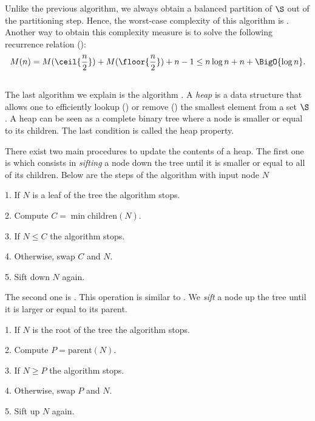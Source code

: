 Unlike the previous algorithm, we always obtain a balanced partition of
\(\S\) out of the partitioning step. Hence, the worst-case complexity of this
algorithm is . Another way to obtain this complexity measure
is to solve the following recurrence relation (\citet*{OEIS:A001855}):
\begin{displaymath}
M(n) = M(\ceil{\frac{n}{2}}) + M(\floor{\frac{n}{2}}) + n - 1 \le n \log n +
n + \BigO{\log n}.
\end{displaymath}

\subsection{\heapsort}
The last algorithm we explain is the \heapsort algorithm
\cite{williams:1964}. A \emph{heap} is a data structure that allows one to
efficiently lookup () or remove () the smallest element
from a set \(\S\). A heap can be seen as a complete binary tree where a node
is smaller or equal to its children. The last condition is called the heap property.

There exist two main procedures to update the contents of a heap.
The first one is \siftdown which consists in \emph{sifting} a node down
the tree until it is smaller or equal to all of its children. Below are the
steps of the \siftdown algorithm with input node \(N\)
\begin{algorithm}[\siftdown]
\item[1.] If \(N\) is a leaf of the tree the algorithm stops.
\item[2.] Compute \(C = \min \text{children}(N)\).
\item[3.] If \(N \le C\) the algorithm stops.
\item[4.] Otherwise, swap \(C\) and \(N\).
\item[5.] Sift down \(N\) again.
\end{algorithm}
The second one is \siftup. This operation is similar to \siftdown.
We \emph{sift} a node up the tree until it is larger or equal to its parent.
\begin{algorithm}[\siftup]
\item[1.] If \(N\) is the root of the tree the algorithm stops.
\item[2.] Compute \(P = \text{parent}(N)\).
\item[3.] If \(N \ge P\) the algorithm stops.
\item[4.] Otherwise, swap \(P\) and \(N\).
\item[5.] Sift up \(N\) again.
\end{algorithm}

